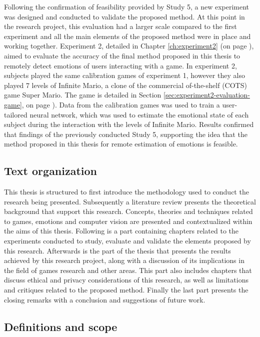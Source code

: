Following the confirmation of feasibility provided by Study 5, a new experiment was designed and conducted to validate the proposed method. At this point in the research project, this evaluation had a larger scale compared to the first experiment and all the main elements of the proposed method were in place and working together. Experiment 2, detailed in Chapter \ref{ch:experiment2} (on page \pageref{ch:experiment2}), aimed to evaluate the accuracy of the final method proposed in this thesis to remotely detect emotions of users interacting with a game. In experiment 2, subjects played the same calibration games of experiment 1, however they also played 7 levels of Infinite Mario, a clone of the commercial of-the-shelf (COTS) game Super Mario. The game is detailed in Section \ref{sec:experiment2-evaluation-game}, on page \pageref{sec:experiment2-evaluation-game}). Data from the calibration games was used to train a user-tailored neural network, which was used to estimate the emotional state of each subject during the interaction with the levels of Infinite Mario. Results confirmed that findings of the previously conducted Study 5, supporting the idea that the method proposed in this thesis for remote estimation of emotions is feasible.

\subsection{Text organization}

This thesis is structured to first introduce the methodology used to conduct the research being presented. Subsequently a literature review presents the theoretical background that support this research. Concepts, theories and techniques related to games, emotions and computer vision are presented and contextualized within the aims of this thesis. Following is a part containing chapters related to the experiments conducted to study, evaluate and validate the elements proposed by this research. Afterwards is the part of the thesis that presents the results achieved by this research project, along with a discussion of its implications in the field of games research and other areas. This part also includes chapters that discuss ethical and privacy considerations of this research, as well as limitations and critiques related to the proposed method. Finally the last part presents the closing remarks with a conclusion and suggestions of future work.

\subsection{Definitions and scope}


